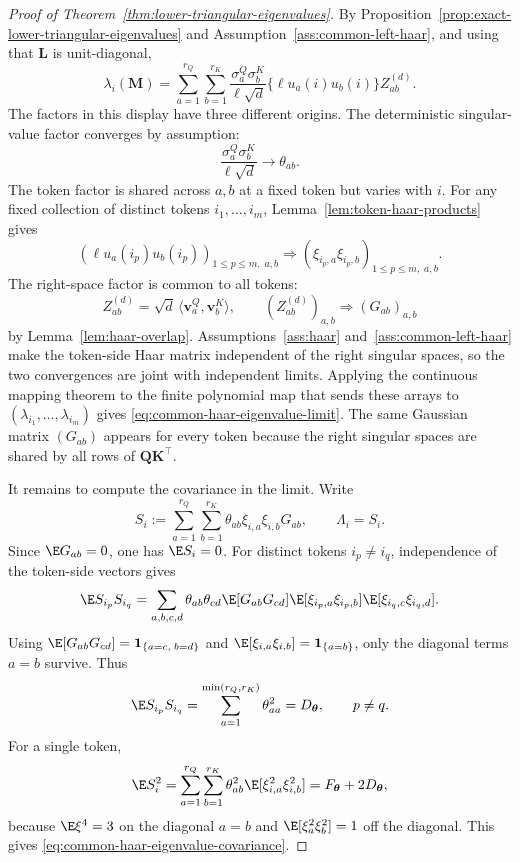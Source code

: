 \documentclass{article}
\newcommand{\weak}{\Rightarrow}
\newcommand{\one}{\mathbf{1}}
\newcommand{\bM}{\mathbf{M}}
\newcommand{\bL}{\mathbf{L}}
\newcommand{\bQ}{\mathbf{Q}}
\newcommand{\bK}{\mathbf{K}}
\newcommand{\bv}{\mathbf{v}}
\theoremstyle{definition}
\theoremstyle{remark}
\begin{document}
\begin{proof}[Proof of Theorem~\ref{thm:lower-triangular-eigenvalues}]
By Proposition~\ref{prop:exact-lower-triangular-eigenvalues} and
Assumption~\ref{ass:common-left-haar}, and using that $\bL$ is unit-diagonal,
\[
    \lambda_i(\bM)
    =
    \sum_{a=1}^{r_Q}\sum_{b=1}^{r_K}
    \frac{\sigma^Q_a\sigma^K_b}{\ell\sqrt d}
    \{\ell u_a(i)u_b(i)\}
    Z_{ab}^{(d)}.
\]
The factors in this display have three different origins.  The deterministic
singular-value factor converges by assumption:
\[
    \frac{\sigma^Q_a\sigma^K_b}{\ell\sqrt d}
    \longrightarrow
    \theta_{ab}.
\]
The token factor is shared across $a,b$ at a fixed token but varies with $i$.
For any fixed collection of distinct tokens $i_1,\ldots,i_m$,
Lemma~\ref{lem:token-haar-products} gives
\[
    \left(\ell u_a(i_p)u_b(i_p)\right)_{1\leq p\leq m,\;a,b}
    \weak
    \left(\xi_{i_p,a}\xi_{i_p,b}\right)_{1\leq p\leq m,\;a,b}.
\]
The right-space factor is common to all tokens:
\[
    Z_{ab}^{(d)}
    =
    \sqrt d\,\langle\bv^Q_a,\bv^K_b\rangle,
    \qquad
    (Z_{ab}^{(d)})_{a,b}\weak (G_{ab})_{a,b}
\]
by Lemma~\ref{lem:haar-overlap}.  Assumptions~\ref{ass:haar}
and~\ref{ass:common-left-haar} make the token-side Haar matrix independent of the
right singular spaces, so the two convergences are joint with independent
limits.  Applying the continuous mapping theorem to the finite polynomial map
that sends these arrays to
$(\lambda_{i_1},\ldots,\lambda_{i_m})$ gives
\eqref{eq:common-haar-eigenvalue-limit}.  The same Gaussian matrix
$(G_{ab})$ appears for every token because the right singular spaces are shared
by all rows of $\bQ\bK^\top$.

It remains to compute the covariance in the limit.  Write
\[
    S_i
    :=
    \sum_{a=1}^{r_Q}\sum_{b=1}^{r_K}
    \theta_{ab}\xi_{i,a}\xi_{i,b}G_{ab},
    \qquad
    \Lambda_i=S_i.
\]
Since $\E G_{ab}=0$, one has $\E S_i=0$.  For distinct tokens $i_p\neq i_q$,
independence of the token-side vectors gives
\[
    \E S_{i_p}S_{i_q}
    =
    \sum_{a,b,c,d}
    \theta_{ab}\theta_{cd}
    \E[G_{ab}G_{cd}]
    \E[\xi_{i_p,a}\xi_{i_p,b}]
    \E[\xi_{i_q,c}\xi_{i_q,d}].
\]
Using
$\E[G_{ab}G_{cd}]=\one_{\{a=c,\;b=d\}}$ and
$\E[\xi_{i,a}\xi_{i,b}]=\one_{\{a=b\}}$, only the diagonal terms $a=b$ survive.
Thus
\[
    \E S_{i_p}S_{i_q}
    =
    \sum_{a=1}^{\min(r_Q,r_K)}\theta_{aa}^2
    =
    D_{\boldsymbol{\theta}},
    \qquad p\neq q.
\]
For a single token,
\[
    \E S_i^2
    =
    \sum_{a=1}^{r_Q}\sum_{b=1}^{r_K}
    \theta_{ab}^2\E[\xi_{i,a}^2\xi_{i,b}^2]
    =
    F_{\boldsymbol{\theta}}+2D_{\boldsymbol{\theta}},
\]
because $\E\xi^4=3$ on the diagonal $a=b$ and
$\E[\xi_a^2\xi_b^2]=1$ off the diagonal.  This gives
\eqref{eq:common-haar-eigenvalue-covariance}.
\end{proof}
\end{document}
